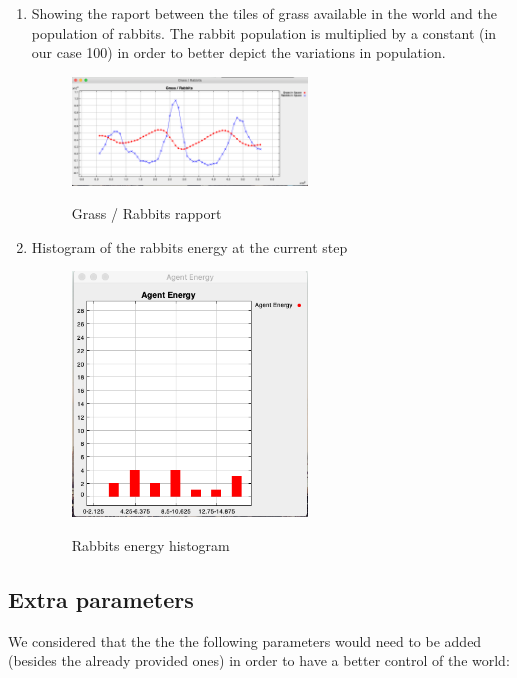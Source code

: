 \documentclass[11pt]{article}
\begin{document}
\begin{enumerate}
\item  Showing the raport between the tiles of grass available in the world and the population of rabbits. The rabbit population is multiplied by a constant (in our case 100) in order to better depict the variations in population.
\begin{figure}[H]
\includegraphics[width=0.59\textwidth]{chart}
\centering
\label{fig:grass-rabits-chart}
\caption{ Grass / Rabbits rapport }
\end{figure}

\item  Histogram of the rabbits energy at the current step
\begin{figure}[H]
\includegraphics[width=0.59\textwidth]{histogram}
\centering
\label{fig:grass-rabits-histogram}
\caption{ Rabbits energy histogram }
\end{figure}

\end{enumerate}

\subsection*{Extra parameters}
We considered that the the the following parameters would need to be added (besides the already provided ones) in order to have a better control of the world:
\end{document}
